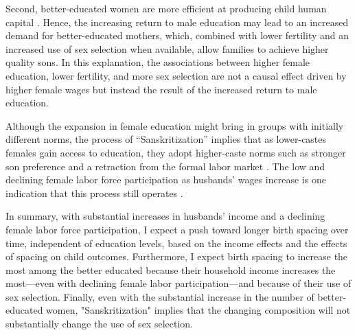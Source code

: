 Second, better-educated women are more efficient at producing child human capital 
\citep{Behrman1999}.
Hence, the increasing return to male education may lead to an increased demand for 
better-educated mothers, which, combined with lower fertility and an increased use
of sex selection when available, allow families to achieve higher quality sons.
In this explanation, the associations between higher female education, lower fertility, 
and more sex selection are not a causal effect driven by higher female wages but instead 
the result of the increased return to male education. 


Although the expansion in female education might bring in groups with initially different 
norms, the process of ``Sanskritization'' implies that as lower-castes females gain access 
to education, they adopt higher-caste norms such as stronger son preference and a retraction 
from the formal labor market \citep{Srinivas1956}.
The low and declining female labor force participation as husbands' wages increase 
is one indication that this process still operates \citep{Abraham2013,Chatterjee2018}.


In summary, with substantial increases in husbands' income and a declining female labor 
force participation, I expect a push toward longer birth spacing over time, independent
of education levels, based on the income effects and the effects of spacing
on child outcomes.
Furthermore, I expect birth spacing to increase the most among the better educated 
because their household income increases the most---even with declining female labor 
participation---and because of their use of sex selection.
Finally, even with the substantial increase in the number of better-educated women, 
"Sanskritization" implies that the changing composition will not substantially change 
the use of sex selection.






